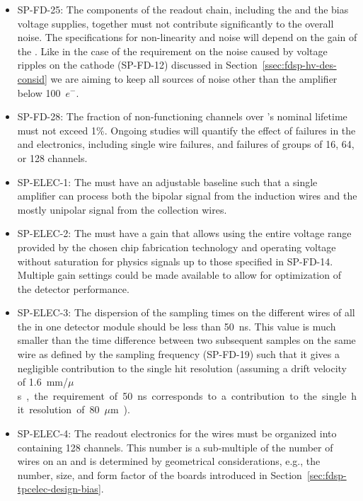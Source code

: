 \begin{itemize}
\item SP-FD-25: 
The components of the readout chain, including the 
and the bias voltage supplies, together must not contribute significantly to
the overall noise. The  specifications for non-linearity and 
noise will depend on the gain of the . Like in the case of
the requirement on the noise caused by voltage ripples on the cathode
(SP-FD-12) discussed in Section~\ref{ssec:fdsp-hv-des-consid} we are
aiming to keep all sources of noise other than the 
amplifier below \SI{100}{$e^-$}.

\item SP-FD-28: The fraction of non-functioning channels over 
's nominal \dunelifetime lifetime must not exceed 1\%. 
Ongoing studies will quantify the effect of failures
in the  and electronics, including
single wire failures, and failures of groups of
\num{16}, \num{64}, or \num{128} channels.

\item SP-ELEC-1: The  must have an adjustable baseline such that a single
amplifier can process both the bipolar signal from the induction wires and the mostly 
unipolar signal from the collection wires. 

\item SP-ELEC-2: The  must have a gain that allows using the entire
voltage range provided by the chosen chip fabrication technology and operating
voltage without saturation for physics signals up to those specified in
SP-FD-14. Multiple gain settings could be made available to allow for optimization
of the detector performance.

\item SP-ELEC-3: The dispersion of the sampling times on the different wires of
all the  in one   detector module should
be less than \SI{50}{ns}. This value is much smaller than the 
time difference between two subsequent samples on the same wire
as defined by the sampling frequency (SP-FD-19) such that it gives
a negligible contribution to the single hit resolution (assuming
a drift velocity of \SI{1.6}{mm/$\mu$s}, the requirement of \SI{50}{ns}
corresponds to a contribution to the single hit resolution of \SI{80}{$\mu$m}).

\item SP-ELEC-4: The readout electronics for the  wires must be organized
into  containing 128 channels. This number is a sub-multiple
of the number of wires on an  and is determined
by geometrical considerations, e.g., the number, size, and form
factor of the  boards introduced in Section~\ref{sec:fdsp-tpcelec-design-bias}.


\end{itemize}
